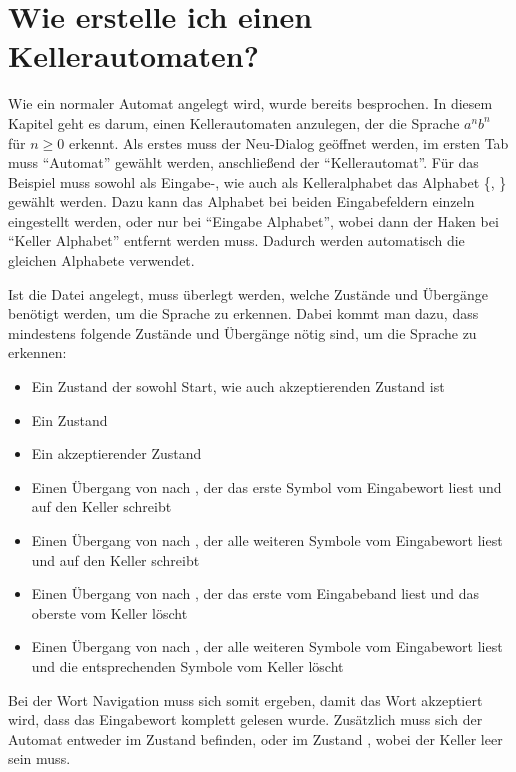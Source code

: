 \chapter{Wie erstelle ich einen Kellerautomaten?}\label{PDA}


Wie ein normaler Automat angelegt wird, wurde bereits besprochen. In diesem
Kapitel geht es darum, einen Kellerautomaten anzulegen, der die Sprache $a^n
b^n$ für $n \geq 0$ erkennt. Als erstes muss der Neu-Dialog geöffnet werden, im ersten
Tab muss "`Automat"' gewählt werden, anschließend der "`Kellerautomat"'. Für
das Beispiel muss sowohl als Eingabe-, wie auch als Kelleralphabet das Alphabet
\{, \} gewählt werden. Dazu kann das Alphabet bei beiden
Eingabefeldern einzeln eingestellt werden, oder nur bei "`Eingabe Alphabet"',
wobei dann der Haken bei "`Keller Alphabet"' entfernt werden muss. Dadurch werden
automatisch die gleichen Alphabete verwendet.\vspace{10pt}

Ist die Datei angelegt, muss überlegt werden, welche Zustände und Übergänge
benötigt werden, um die Sprache zu erkennen. Dabei kommt man dazu, dass
mindestens folgende Zustände und Übergänge nötig sind, um die Sprache zu
erkennen:

\begin{itemize}
  \item Ein Zustand  der sowohl Start, wie auch akzeptierenden
  Zustand ist
  \item Ein Zustand 
  \item Ein akzeptierender Zustand 
  \item Einen Übergang von  nach , der das erste Symbol
   vom Eingabewort liest und auf den Keller schreibt
  \item Einen Übergang von  nach , der alle weiteren Symbole
   vom Eingabewort liest und auf den Keller schreibt
  \item Einen Übergang von  nach , der das erste 
  vom Eingabeband liest und das oberste  vom Keller löscht
  \item Einen Übergang von  nach , der alle weiteren
  Symbole  vom Eingabewort liest und die entsprechenden Symbole
   vom Keller löscht
\end{itemize}

Bei der Wort Navigation muss sich somit ergeben, damit das Wort akzeptiert wird,
dass das Eingabewort komplett gelesen wurde. Zusätzlich muss sich der Automat
entweder im Zustand  befinden, oder im Zustand , wobei der
Keller leer sein muss.\vspace{10pt}

